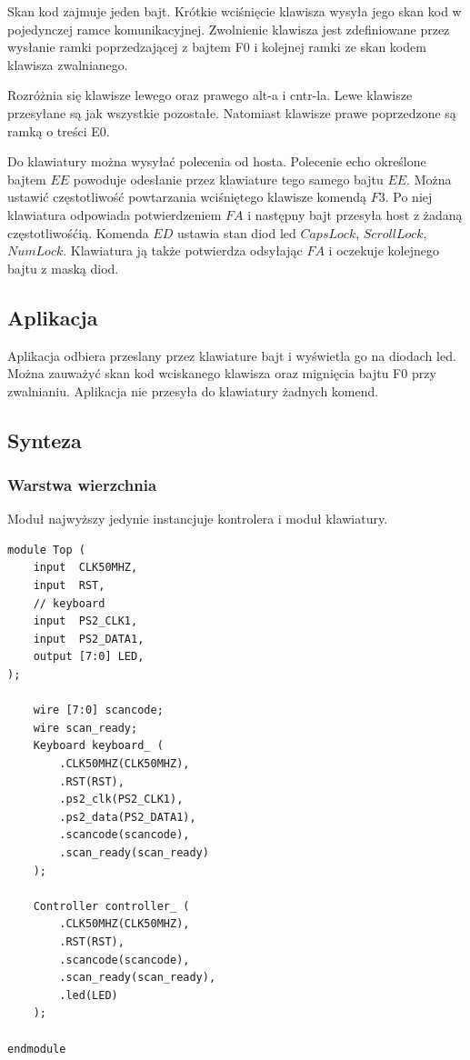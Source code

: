 \documentclass[a4paper,12pt]{article}
\begin{document}
Skan kod zajmuje jeden bajt. Krótkie wciśnięcie klawisza wysyła jego skan kod w pojedynczej ramce komunikacyjnej. Zwolnienie klawisza jest zdefiniowane przez wysłanie ramki poprzedzającej z bajtem F0 i kolejnej ramki ze skan kodem klawisza zwalnianego.

Rozróżnia się klawisze lewego oraz prawego alt-a i cntr-la. Lewe klawisze przesyłane są jak wszystkie pozostałe. Natomiast klawisze prawe poprzedzone są ramką o treści E0.

Do klawiatury można wysyłać polecenia od hosta. Polecenie echo określone bajtem $EE$ powoduje odesłanie przez klawiature tego samego bajtu $EE$. Można ustawić częstotliwość powtarzania wciśniętego klawisze komendą $F3$. Po niej klawiatura odpowiada potwierdzeniem $FA$ i następny bajt przesyła host z żadaną częstotliwośćią. Komenda $ED$ ustawia stan diod led $Caps Lock$, $Scroll Lock$, $Num Lock$. Klawiatura ją także potwierdza odsyłając $FA$ i oczekuje kolejnego bajtu z maską diod.

\subsection{Aplikacja}

Aplikacja odbiera przeslany przez klawiature bajt i wyświetla go na diodach led. Można zauważyć skan kod wciskanego klawisza oraz mignięcia bajtu F0 przy zwalnianiu. Aplikacja nie przesyła do klawiatury żadnych komend.

\subsection{Synteza}

\subsubsection{Warstwa wierzchnia}
Moduł najwyższy jedynie instancjuje kontrolera i moduł klawiatury.
\begin{lstlisting}[label=Top,caption=Top.v]
module Top (
    input  CLK50MHZ,
    input  RST,
    // keyboard
    input  PS2_CLK1,
    input  PS2_DATA1,
    output [7:0] LED,
);

    wire [7:0] scancode;
    wire scan_ready;
    Keyboard keyboard_ (
        .CLK50MHZ(CLK50MHZ),
        .RST(RST),
        .ps2_clk(PS2_CLK1),
        .ps2_data(PS2_DATA1),
        .scancode(scancode),
        .scan_ready(scan_ready)
    );

    Controller controller_ (
        .CLK50MHZ(CLK50MHZ),
        .RST(RST),
        .scancode(scancode),
        .scan_ready(scan_ready),
        .led(LED)
    );

endmodule
\end{lstlisting}
\end{document}
